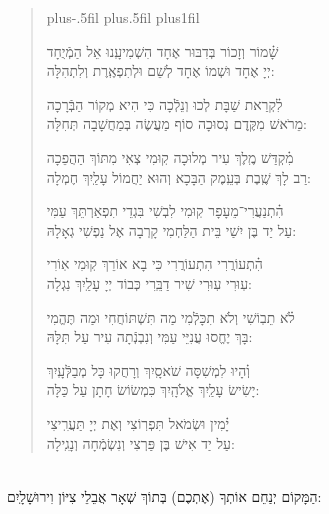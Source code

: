\documentclass[twoside, openany, parskip=half, 11pt]{book}
\begin{document}
\begin{quote}
		\leftskip=0pt plus-.5fil
		\rightskip=0pt plus.5fil
		\parfillskip=0pt plus1fil


\lechadodi

 שָׁ֗מוֹר וְזָכוֹר בְּדִבּוּר אֶחָד 	\hfill
הִשְׁמִיעָֽנוּ אֵל הַמְֿיֻחָד \\
יְיָ אֶחָד וּשְׁמוֹ אֶחָד \hfill
לְשֵׁם וּלְתִפְאֶֽרֶת וְלִתְהִלָּה:

\lechadodi

 לִ֗קְרַאת שַׁבָּת לְכוּ וְנֵלְֿכָה 	\hfill
כִּי הִיא מְקוֹר הַבְּֿרָכָה \\
מֵרֹאשׁ מִקֶּֽדֶם נְסוּכָה \hfill
סוֹף מַעֲשֶׂה בְּמַחֲשָׁבָה תְּחִלָּה: 

\lechadodi

 מִ֗קְדַּשׁ מֶֽלֶךְ עִיר מְלוּכָה \hfill
קֽוּמִי צְאִי מִתּוֹךְ הַהֲפֵכָה \\
רַב לָךְ שֶֽׁבֶת בְּעֵֽמֶק הַבָּכָא 	\hfill
וְהוּא יַחֲמוֹל עָלַֽיִךְ חֶמְלָה:

\lechadodi

 הִ֗תְנַעֲרִי־מֵעָפָר קֽוּמִי \hfill
לִבְשִׁי בִּגְדֵי תִפְאַרְתֵּךְ עַמִּי \\
עַל יַד בֶּן יִשַׁי בֵּית הַלַּחְמִי 	\hfill
קָרְבָה אֶל נַפְשִׁי גְאָלָהּ:

\lechadodi

 הִ֗תְעוֹרֲרִי הִתְעוֹרֲרִי \hfill
כִּי בָא אוֹרֵךְ קֽוּמִי אֽוֹרִי \\
עֽוּרִי עֽוּרִי שִׁיר דַבֵּֽרִי \hfill
כְּבוֹד יְיָ עָלַֽיִךְ נִגְלָה:

\lechadodi

 לֹ֗א תֵבֽוֹשִׁי וְלֹא תִכָּלְֿמִי \hfill
מַה תִּשְׁתּוֹחֲחִי וּמַה תֶּהֱמִי \\
בָּךְ יֶחֱסוּ עֲנִיֵּי עַמִּי 	\hfill
וְנִבְנְֿתָה עִיר עַל תִּלָּהּ: 

\lechadodi

 וְ֗הָיוּ לִמְשִׁסָּה שֹׁאסָֽיִךְ \hfill 
וְרָחֲקוּ כָּל מְבַלְּֿעָֽיִךְ \\
יָשִׂישׂ עָלַֽיִךְ אֱלֹהָֽיִךְ \hfill
כִּמְשׂוֹשׂ חָתָן עַל כַּלָּה:

\lechadodi

 יָ֗מִין וּשְׂמֹאל תִּפְרֽוֹצִי \hfill
וְאֶת יְיָ תַּעֲרִֽיצִי \\
עַל יַד אִישׁ בֶּן פַּרְצִי \hfill
וְנִשְׂמְֿחָה וְנָגִֽילָה:
 
\lechadodi

\end{quote}

\begin{sometimes}

\\
הַמָּקוֹם יְנַחֵם אוֹתְךָ (אֶתְכֶם) בְּתוֹךְ שְׁאָר אֲבֵלֵי צִיּוֹן וִירוּשָׁלָֽיִם:

\end{sometimes}
\end{document}
